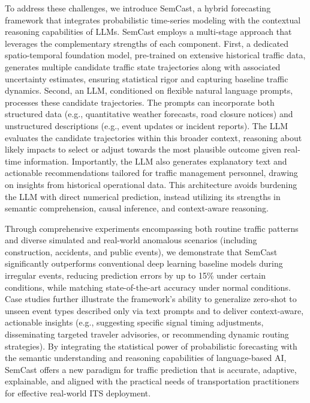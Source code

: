 \documentclass{article}
\begin{document}
To address these challenges, we introduce SemCast, a hybrid forecasting framework that integrates probabilistic time-series modeling with the contextual reasoning capabilities of LLMs. SemCast employs a multi-stage approach that leverages the complementary strengths of each component. First, a dedicated spatio-temporal foundation model, pre-trained on extensive historical traffic data, generates multiple candidate traffic state trajectories along with associated uncertainty estimates, ensuring statistical rigor and capturing baseline traffic dynamics. Second, an LLM, conditioned on flexible natural language prompts, processes these candidate trajectories. The prompts can incorporate both structured data (e.g., quantitative weather forecasts, road closure notices) and unstructured descriptions (e.g., event updates or incident reports). The LLM evaluates the candidate trajectories within this broader context, reasoning about likely impacts to select or adjust towards the most plausible outcome given real-time information. Importantly, the LLM also generates explanatory text and actionable recommendations tailored for traffic management personnel, drawing on insights from historical operational data. This architecture avoids burdening the LLM with direct numerical prediction, instead utilizing its strengths in semantic comprehension, causal inference, and context-aware reasoning.

Through comprehensive experiments encompassing both routine traffic patterns and diverse simulated and real-world anomalous scenarios (including construction, accidents, and public events), we demonstrate that SemCast significantly outperforms conventional deep learning baseline models during irregular events, reducing prediction errors by up to 15\% under certain conditions, while matching state-of-the-art accuracy under normal conditions. Case studies further illustrate the framework's ability to generalize zero-shot to unseen event types described only via text prompts and to deliver context-aware, actionable insights (e.g., suggesting specific signal timing adjustments, disseminating targeted traveler advisories, or recommending dynamic routing strategies). By integrating the statistical power of probabilistic forecasting with the semantic understanding and reasoning capabilities of language-based AI, SemCast offers a new paradigm for traffic prediction that is accurate, adaptive, explainable, and aligned with the practical needs of transportation practitioners for effective real-world ITS deployment.
\end{document}
